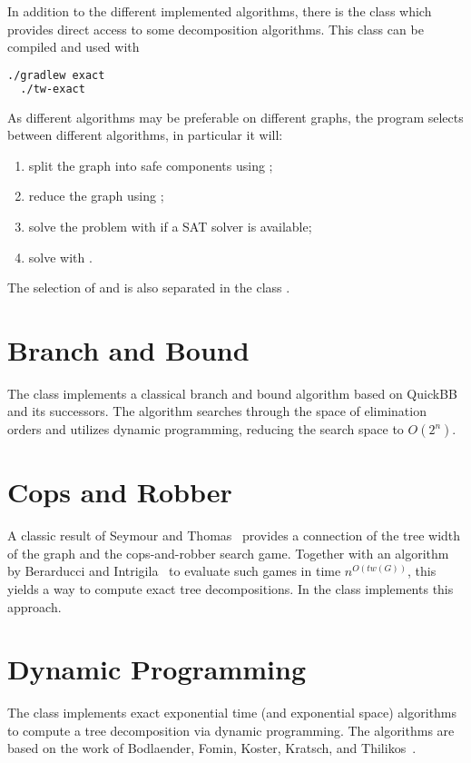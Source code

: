\documentclass[a4paper, ukenglish, twoside, openright]{jdrasilmanual}
\begin{document}
In addition to the different implemented algorithms, there is the
class  which provides direct access to some
decomposition algorithms. This class can be compiled and used with
\begin{lstlisting}[language=bash]
  ./gradlew exact
  ./tw-exact
\end{lstlisting}
As different algorithms may be preferable on different graphs, the
program selects between different algorithms, in particular it will:
\begin{enumerate}
  \item split the graph into safe components using ;
  \item reduce the graph using ;
  \item solve the problem with  if a SAT solver
    is available;
  \item solve with .
\end{enumerate}
The selection of  and  is
also separated in the class .

\section{Branch and Bound}
The class  implements a classical branch and bound algorithm based on QuickBB~\cite{GogateD2004} and its successors.
The algorithm searches through the space of elimination orders and utilizes dynamic programming,
reducing the search space to $O(2^n)$.

\section{Cops and Robber}
A classic result of Seymour and Thomas~\cite{SeymourT1993}
provides a connection of the tree width of the graph and the
cops-and-robber search game. Together with an algorithm by Berarducci
and Intrigila~\cite{BerarducciI1993} to evaluate such games in time
$n^{O(tw(G))}$, this yields a way to compute exact tree decompositions. In
\Jdrasil{} the class  implements this approach.

\section{Dynamic Programming}
The class  implements exact exponential time (and exponential space)
algorithms to compute a tree decomposition via dynamic programming.
The algorithms are based on the work of 
Bodlaender, Fomin, Koster, Kratsch, and Thilikos~\cite{BodlaenderFKKT2012}.
\end{document}
